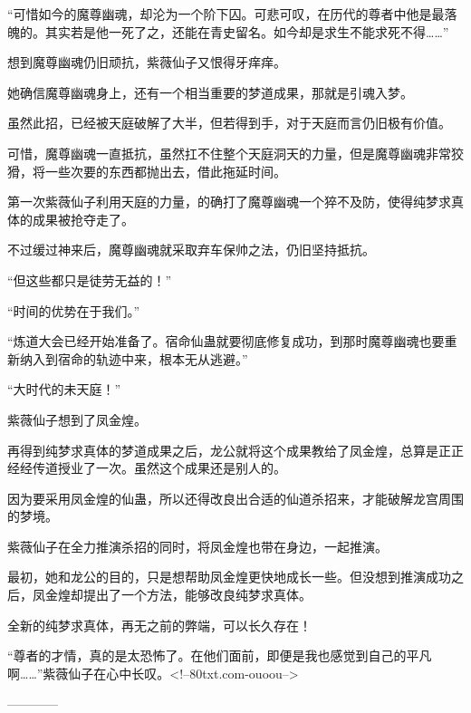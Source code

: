 \begin{this_body}
“可惜如今的魔尊幽魂，却沦为一个阶下囚。可悲可叹，在历代的尊者中他是最落魄的。其实若是他一死了之，还能在青史留名。如今却是求生不能求死不得……”

想到魔尊幽魂仍旧顽抗，紫薇仙子又恨得牙痒痒。

她确信魔尊幽魂身上，还有一个相当重要的梦道成果，那就是引魂入梦。

虽然此招，已经被天庭破解了大半，但若得到手，对于天庭而言仍旧极有价值。

可惜，魔尊幽魂一直抵抗，虽然扛不住整个天庭洞天的力量，但是魔尊幽魂非常狡猾，将一些次要的东西都抛出去，借此拖延时间。

第一次紫薇仙子利用天庭的力量，的确打了魔尊幽魂一个猝不及防，使得纯梦求真体的成果被抢夺走了。

不过缓过神来后，魔尊幽魂就采取弃车保帅之法，仍旧坚持抵抗。

“但这些都只是徒劳无益的！”

“时间的优势在于我们。”

“炼道大会已经开始准备了。宿命仙蛊就要彻底修复成功，到那时魔尊幽魂也要重新纳入到宿命的轨迹中来，根本无从逃避。”

“大时代的未天庭！”

紫薇仙子想到了凤金煌。

再得到纯梦求真体的梦道成果之后，龙公就将这个成果教给了凤金煌，总算是正正经经传道授业了一次。虽然这个成果还是别人的。

因为要采用凤金煌的仙蛊，所以还得改良出合适的仙道杀招来，才能破解龙宫周围的梦境。

紫薇仙子在全力推演杀招的同时，将凤金煌也带在身边，一起推演。

最初，她和龙公的目的，只是想帮助凤金煌更快地成长一些。但没想到推演成功之后，凤金煌却提出了一个方法，能够改良纯梦求真体。

全新的纯梦求真体，再无之前的弊端，可以长久存在！

“尊者的才情，真的是太恐怖了。在他们面前，即便是我也感觉到自己的平凡啊……”紫薇仙子在心中长叹。<!--80txt.com-ouoou-->

------------

\end{this_body}

